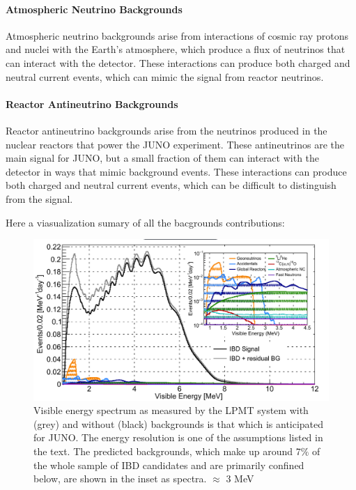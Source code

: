 \paragraph{Atmospheric Neutrino Backgrounds}

Atmospheric neutrino backgrounds arise from interactions of cosmic ray protons and nuclei with the Earth's atmosphere, which produce a flux of neutrinos that can interact with the detector. These interactions can produce both charged and neutral current events, which can mimic the signal from reactor neutrinos.

\paragraph{Reactor Antineutrino Backgrounds}

Reactor antineutrino backgrounds arise from the neutrinos produced in the nuclear reactors that power the JUNO experiment. These antineutrinos are the main signal for JUNO, but a small fraction of them can interact with the detector in ways that mimic background events. These interactions can produce both charged and neutral current events, which can be difficult to distinguish from the signal.


Here a viasualization sumary of all the bacgrounds contributions:

\begin{figure}[h]
	\centering
	\includegraphics[width=0.7\linewidth]{Images/backgrounds_spectrum}
	\caption{Visible energy spectrum as measured by the LPMT system with (grey) and without (black) backgrounds is that which is anticipated for JUNO. The energy resolution is one of the assumptions listed in the text. The predicted backgrounds, which make up around 7$\%$ of the whole sample of IBD candidates and are primarily confined below, are shown in the inset as spectra. $\approx$ 3 MeV}
	\label{fig:backgroundsspectrum}
\end{figure}
